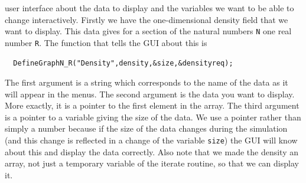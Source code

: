 \documentclass[12pt,letterpaper]{article}
\begin{document}
user interface about the data to display and the variables we want to
be able to change interactively. Firstly we have the one-dimensional
density field that we want to display. This data gives for a
section of the natural numbers \texttt{N} one real number
\texttt{R}. The function that tells the GUI about this is
\begin{verbatim}
  DefineGraphN_R("Density",density,&size,&densityreq);
\end{verbatim}
The first argument is a string which corresponds to the name of the
data as it will appear in the menus. The second argument is the data
you want to display. More exactly, it is a pointer to the first
element in the array. The third argument is a pointer to a variable
giving the size of the data. We use a pointer rather than simply a
number because if the size of the data changes during the simulation (and
this change is reflected in a change of the variable \texttt{size})
the GUI will know about this and display the data
correctly.
Also note that we made the density an array, not just a temporary
variable of the iterate routine, so that we can display it.
\end{document}
